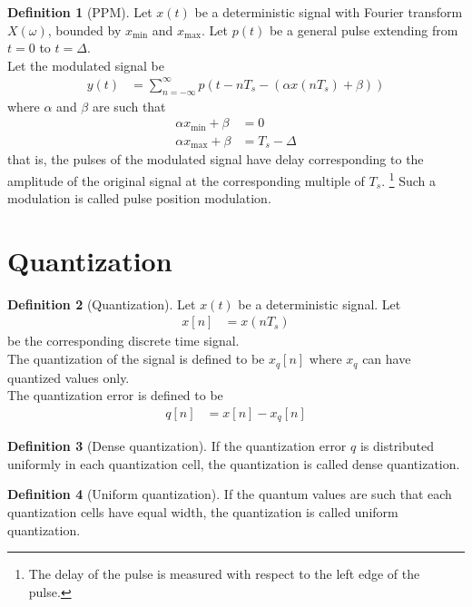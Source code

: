 \documentclass[titlepage, fleqn, a4paper, 12pt, twoside]{article}
\theoremstyle{definition}
\newtheorem{definition}{Definition}
\theoremstyle{theorem}
\begin{document}
\begin{definition}[PPM]
	Let $x(t)$ be a deterministic signal with Fourier transform $X(\omega)$, bounded by $x_{\text{min}}$ and $x_{\text{max}}$.
	Let $p(t)$ be a general pulse extending from $t = 0$ to $t = \Delta$.\\
	Let the modulated signal be
	\begin{align*}
		y(t) &= \sum\limits_{n = -\infty}^{\infty} p\left( t - n T_s - \left( \alpha x(n T_s) + \beta \right) \right)
	\end{align*}
	where $\alpha$ and $\beta$ are such that
	\begin{align*}
		\alpha x_{\text{min}} + \beta &= 0\\
		\alpha x_{\text{max}} + \beta &= T_s - \Delta
	\end{align*}
	that is, the pulses of the modulated signal have delay corresponding to the amplitude of the original signal at the corresponding multiple of $T_s$.
	\footnote{The delay of the pulse is measured with respect to the left edge of the pulse.}
	Such a modulation is called pulse position modulation.
	\label{def:PPM}
\end{definition}

\clearpage
\part{Quantization}

\begin{definition}[Quantization]
	Let $x(t)$ be a deterministic signal.
	Let
	\begin{align*}
		x[n] &= x(n T_s)
	\end{align*}
	be the corresponding discrete time signal.\\
	The quantization of the signal is defined to be $x_q[n]$ where $x_q$ can have quantized values only.\\
	The quantization error is defined to be
	\begin{align*}
		q[n] &= x[n] - x_q[n]
	\end{align*}
\end{definition}

\begin{definition}[Dense quantization]
	If the quantization error $q$ is distributed uniformly in each quantization cell, the quantization is called dense quantization.
\end{definition}

\begin{definition}[Uniform quantization]
	If the quantum values are such that each quantization cells have equal width, the quantization is called uniform quantization.
\end{definition}
\end{document}

